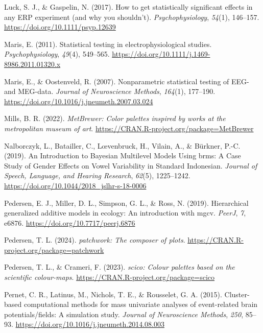 \documentclass[
  doc,
  floatsintext,
  longtable,
  a4paper,
  nolmodern,
  notxfonts,
  notimes,
  colorlinks=true,linkcolor=blue,citecolor=blue,urlcolor=blue]{apa7}
\newlength{\cslhangindent}
\newenvironment{CSLReferences}[2] %
 {\begin{list}{}{%
  \setlength{\itemindent}{0pt}
  \setlength{\leftmargin}{0pt}
  \setlength{\parsep}{0pt}
  \ifodd #1
   \setlength{\leftmargin}{\cslhangindent}
   \setlength{\itemindent}{-1\cslhangindent}
  \fi
  \setlength{\itemsep}{#2\baselineskip}}}
 {\end{list}}
\begin{document}
\begin{CSLReferences}{1}{0}
Luck, S. J., \& Gaspelin, N. (2017). How to get statistically
significant effects in any {ERP} experiment (and why you shouldn't).
\emph{Psychophysiology}, \emph{54}(1), 146--157.
\url{https://doi.org/10.1111/psyp.12639}

Maris, E. (2011). Statistical testing in electrophysiological studies.
\emph{Psychophysiology}, \emph{49}(4), 549--565.
\url{https://doi.org/10.1111/j.1469-8986.2011.01320.x}

Maris, E., \& Oostenveld, R. (2007). Nonparametric statistical testing
of EEG- and MEG-data. \emph{Journal of Neuroscience Methods},
\emph{164}(1), 177--190.
\url{https://doi.org/10.1016/j.jneumeth.2007.03.024}

Mills, B. R. (2022). \emph{{MetBrewer}: Color palettes inspired by works
at the metropolitan museum of art}.
\url{https://CRAN.R-project.org/package=MetBrewer}

Nalborczyk, L., Batailler, C., Lœvenbruck, H., Vilain, A., \& Bürkner,
P.-C. (2019). An Introduction to Bayesian Multilevel Models Using brms:
A Case Study of Gender Effects on Vowel Variability in Standard
Indonesian. \emph{Journal of Speech, Language, and Hearing Research},
\emph{62}(5), 1225--1242.
\url{https://doi.org/10.1044/2018_jslhr-s-18-0006}

Pedersen, E. J., Miller, D. L., Simpson, G. L., \& Ross, N. (2019).
Hierarchical generalized additive models in ecology: An introduction
with mgcv. \emph{PeerJ}, \emph{7}, e6876.
\url{https://doi.org/10.7717/peerj.6876}

Pedersen, T. L. (2024). \emph{{patchwork}: The composer of plots}.
\url{https://CRAN.R-project.org/package=patchwork}

Pedersen, T. L., \& Crameri, F. (2023). \emph{{scico}: Colour palettes
based on the scientific colour-maps}.
\url{https://CRAN.R-project.org/package=scico}

Pernet, C. R., Latinus, M., Nichols, T. E., \& Rousselet, G. A. (2015).
Cluster-based computational methods for mass univariate analyses of
event-related brain potentials/fields: A simulation study. \emph{Journal
of Neuroscience Methods}, \emph{250}, 85--93.
\url{https://doi.org/10.1016/j.jneumeth.2014.08.003}


\end{CSLReferences}
\end{document}

